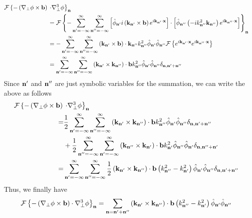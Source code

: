 \documentclass[oneside,a4paper,11pt]{report}
\begin{document}
\begin{align}
    \mathcal{F} \left \{ - \left (\nabla_\perp \phi \times \mathbf{b} \right ) \right . & \left . \cdot \nabla^3_\perp \phi \right \}_{\mathbf{n}} \nonumber \\
    &= \mathcal{F} \left \{ -\sum_{\mathbf{n}'=-\infty}^\infty \sum_{\mathbf{n}''=-\infty}^\infty \left [ \hat{\phi}_{\mathbf{n}'} i \left ( \mathbf{k}_{\mathbf{n}'} \times \mathbf{b} \right ) e^{i \mathbf{k}_{\mathbf{n}'} \cdot \mathbf{x}} \right ] \cdot \left [ \hat{\phi}_{\mathbf{n}''} \left ( -i k^2_{\mathbf{n}''} \mathbf{k}_{\mathbf{n}''} \right ) e^{i \mathbf{k}_{\mathbf{n}''} \cdot \mathbf{x}} \right ] \right \}_{\mathbf{n}} \nonumber \\
    &= -\sum_{\mathbf{n}'=-\infty}^\infty \sum_{\mathbf{n}''=-\infty}^\infty \left ( \mathbf{k}_{\mathbf{n}'} \times \mathbf{b} \right ) \cdot \mathbf{k}_{\mathbf{n}''} k^2_{\mathbf{n}''} \hat{\phi}_{\mathbf{n}'} \hat{\phi}_{\mathbf{n}''} \mathcal{F} \left \{ e^{i \mathbf{k}_{\mathbf{n}'} \cdot \mathbf{x}} e^{i \mathbf{k}_{\mathbf{n}''} \cdot \mathbf{x}} \right \} \nonumber \\
    &= \sum_{\mathbf{n}'=-\infty}^\infty \sum_{\mathbf{n}''=-\infty}^\infty \left ( \mathbf{k}_{\mathbf{n}'} \times \mathbf{k}_{\mathbf{n}''} \right ) \cdot \mathbf{b} k^2_{\mathbf{n}''} \hat{\phi}_{\mathbf{n}'} \hat{\phi}_{\mathbf{n}''} \delta_{\mathbf{n}, \mathbf{n}' + \mathbf{n}''}
\end{align}
Since $\mathbf{n}'$ and $\mathbf{n}''$ are just symbolic variables for the summation, we can write the above as follows
\begin{align}
    \mathcal{F} \left \{ - \left (\nabla_\perp \phi \times \mathbf{b} \right ) \right . & \left . \cdot \nabla^3_\perp \phi \right \}_{\mathbf{n}} \nonumber \\
    =& \frac{1}{2} \sum_{\mathbf{n}'=-\infty}^\infty \sum_{\mathbf{n}''=-\infty}^\infty \left ( \mathbf{k}_{\mathbf{n}'} \times \mathbf{k}_{\mathbf{n}''} \right ) \cdot \mathbf{b} k^2_{\mathbf{n}''} \hat{\phi}_{\mathbf{n}'} \hat{\phi}_{\mathbf{n}''} \delta_{\mathbf{n}, \mathbf{n}' + \mathbf{n}''} \nonumber \\
    &+ \frac{1}{2} \sum_{\mathbf{n}''=-\infty}^\infty \sum_{\mathbf{n}'=-\infty}^\infty \left ( \mathbf{k}_{\mathbf{n}''} \times \mathbf{k}_{\mathbf{n}'} \right ) \cdot \mathbf{b} k^2_{\mathbf{n}'} \hat{\phi}_{\mathbf{n}''} \hat{\phi}_{\mathbf{n}'} \delta_{\mathbf{n}, \mathbf{n}'' + \mathbf{n}'} \nonumber \\
    =& \sum_{\mathbf{n}'=-\infty}^\infty \sum_{\mathbf{n}''=-\infty}^\infty \frac{1}{2} \left ( \mathbf{k}_{\mathbf{n}'} \times \mathbf{k}_{\mathbf{n}''} \right ) \cdot \mathbf{b} \left ( k^2_{\mathbf{n}''} - k^2_{\mathbf{n}'} \right ) \hat{\phi}_{\mathbf{n}'} \hat{\phi}_{\mathbf{n}''} \delta_{\mathbf{n}, \mathbf{n}' + \mathbf{n}''}
\end{align}
Thus, we finally have
\begin{equation}
    \mathcal{F} \left \{ - \left (\nabla_\perp \phi \times \mathbf{b} \right ) \cdot \nabla^3_\perp \phi \right \}_{\mathbf{n}} = \sum_{\mathbf{n} = \mathbf{n}' + \mathbf{n}''} \left ( \mathbf{k}_{\mathbf{n}'} \times \mathbf{k}_{\mathbf{n}''} \right ) \cdot \mathbf{b} \left ( k^2_{\mathbf{n}''} - k^2_{\mathbf{n}'} \right ) \hat{\phi}_{\mathbf{n}'} \hat{\phi}_{\mathbf{n}''}
\end{equation}
\end{document}
